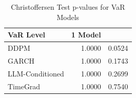 \begin{table}
\caption{Christoffersen Test p-values for VaR Models}
\label{tab:christoffersen_pvalues}
\begin{tabular}{lrr}
\toprule
VaR Level & 1%
Model &  &  \\
\midrule
DDPM & 1.0000 & 0.0524 \\
GARCH & 1.0000 & 0.1743 \\
LLM-Conditioned & 1.0000 & 0.2699 \\
TimeGrad & 1.0000 & 0.7540 \\
\bottomrule
\end{tabular}
\end{table}
